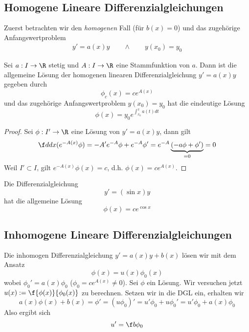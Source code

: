 \documentclass[a4paper,10pt]{scrbook}
\begin{document}
\subsection{Homogene Lineare Differenzialgleichungen}

Zuerst betrachten wir den \emph{homogenen} Fall (für $b(x) = 0$) und das zugehörige Anfangswertproblem
\begin{align*}
	y' = a(x)y \qquad\land\qquad
y(x_0) = y_0
\end{align*}

\begin{st} \label{11.2}
	Sei $a:I \to \R$ stetig und $A:I\to \R$ eine Stammfunktion von $a$.
	Dann ist die allgemeine Lösung der homogenen linearen Differenzialgleichung $y' = a(x) y$ gegeben durch
	\[
		\phi_c (x) = c e^{A(x)}
	\]
	und das zugehörige Anfangswertproblem $y(x_0) = y_0$ hat die eindeutige Lösung
	\[
		\phi(x) = y_0 e^{\int_{x_0}^xa(t)dt}
	\]
	\begin{proof}
		Sei $\phi: I' \to \R$ eine Lösung von $y' = a(x) y$, dann gilt
		\[
			\f d{dx} (e^{-A(x)}\phi) = -A'e^{-A}\phi + e^{-A}\phi' = e^{-A}\underbrace{(-a\phi + \phi')}_{=0} = 0
		\]
		Weil $I'\subset I$, gilt $e^{-A(x)}\phi(x) = c$, d.h. $\phi(x) = c e^{A(x)}$.
	\end{proof}
\end{st}

\begin{ex*}
	Die Differenzialgleichung
	\[
		y' = (\sin x)y
	\]
	hat die allgemeine Lösung
	\[
		\phi(x) = ce^{\cos x}
	\]
\end{ex*}

\subsection{Inhomogene Lineare Differenzialgleichungen}

Die inhomogen Differenzialgleichung $y' = a(x)y + b(x)$ lösen wir mit dem Ansatz
\[
	\phi(x) = u(x) \phi_0(x)
\]
wobei $\phi_0' = a(x) \phi_0$ ($\phi_0 = c e^{A(x)}\neq 0$).
Sei $\phi$ ein Lösung.
Wir versuchen jetzt $u(x) := \f {\phi(x)}{\phi_0(x)}$ zu berechnen.
Setzen wir in die DGL ein, erhalten wir
\[
	a(x)\phi(x) + b(x) = \phi' = (u\phi_0)' = u'\phi_0 + u\phi_0' = u'\phi_0 + a(x)\phi_0
\]
Also ergibt sich
\[
	u' = \f b{\phi_0}
\]
\end{document}
